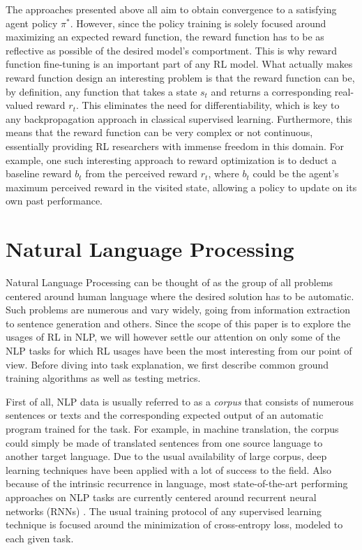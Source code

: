 \documentclass[twocolumn]{article}
\begin{document}
The approaches presented above all aim to obtain convergence to a satisfying agent policy $\pi^*$. However, since the policy training is solely focused around maximizing an expected reward function, the reward function has to be as reflective as possible of the desired model's comportment. This is why reward function fine-tuning is an important part of any RL model. What actually makes reward function design an interesting problem is that the reward function can be, by definition, any function that takes a state $s_t$ and returns a corresponding real-valued reward $r_t$. This eliminates the need for differentiability, which is key to any backpropagation approach in classical supervised learning. Furthermore, this means that the reward function can be very complex or not continuous, essentially providing RL researchers with immense freedom in this domain. For example, one such interesting approach to reward optimization is to deduct a baseline reward $b_t$ from the perceived reward $r_t$, where $b_t$ could be the agent's maximum perceived reward in the visited state, allowing a policy to update on its own past performance.

\section{Natural Language Processing}

Natural Language Processing can be thought of as the group of all problems centered around human language where the desired solution has to be automatic. Such problems are numerous and vary widely, going from information extraction to sentence generation and others. Since the scope of this paper is to explore the usages of RL in NLP, we will however settle our attention on only some of the NLP tasks for which RL usages have been the most interesting from our point of view. Before diving into task explanation, we first describe common ground training algorithms as well as testing metrics.

First of all, NLP data is usually referred to as a \textit{corpus} that consists of numerous sentences or texts and the corresponding expected output of an automatic program trained for the task. For example, in machine translation, the corpus could simply be made of translated sentences from one source language to another target language. Due to the usual availability of large corpus, deep learning techniques have been applied with a lot of success to the field. Also because of the intrinsic recurrence in language, most state-of-the-art performing approaches on NLP tasks are currently centered around recurrent neural networks (RNNs) \citep{elman}. The usual training protocol of any supervised learning technique is focused around the minimization of cross-entropy loss, modeled to each given task.
\end{document}

